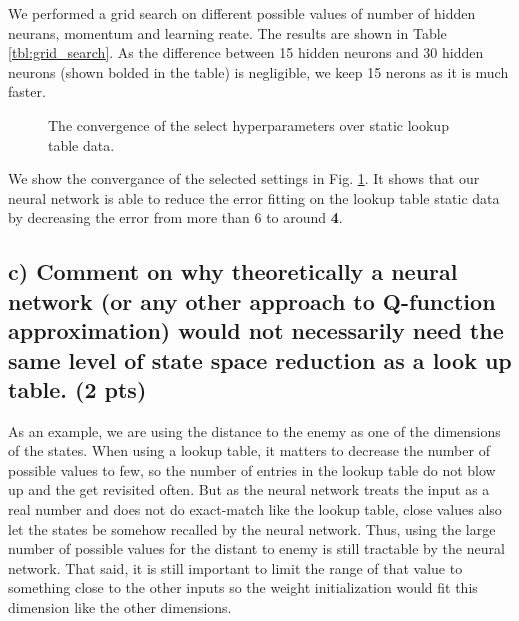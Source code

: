 \documentclass[a4paper,12pt]{article}
\begin{document}
We performed a grid search on different possible values of number of hidden neurans, momentum and learning reate. The results are shown in Table \ref{tbl:grid_search}. As the difference between 15 hidden neurons and 30 hidden neurons (shown bolded in the table) is negligible, we keep 15 nerons as it is much faster. 

\begin{figure}[hbt!]
\caption{The convergence of the select hyperparameters over static lookup table data.}
\label{fig:static_lut}
\end{figure}

We show the convergance of the selected settings in Fig. \ref{fig:static_lut}. It shows that our neural network is able to reduce the error fitting on the lookup table static data by decreasing the error from more than 6 to around \textbf{4}. 

\pagebreak

\subsection*{c) Comment on why theoretically a neural network (or any other approach to Q-function approximation) would not necessarily need the same level of state space reduction as a look up table. (2 pts)}
As an example, we are using the distance to the enemy as one of the dimensions of the states. When using a lookup table, it matters to decrease the number of possible values to few, so the number of entries in the lookup table do not blow up and the get revisited often. But as the neural network treats the input as a real number and does not do exact-match like the lookup table, close values also let the states be somehow recalled by the neural network. Thus, using the large number of possible values for the distant to enemy is still tractable by the neural network. That said, it is still important to limit the range of that value to something close to the other inputs so the weight initialization would fit this dimension like the other dimensions. 
\end{document}
